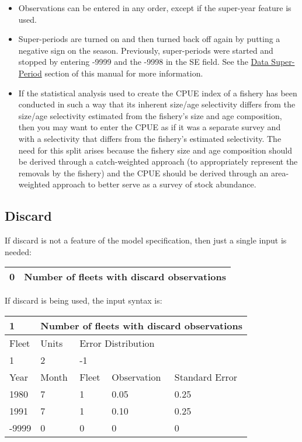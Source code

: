 \begin{itemize}
		\item Observations can be entered in any order, except if the super-year feature is used.
		\item Super-periods are turned on and then turned back off again by putting a negative sign on the season.  Previously, super-periods were started and stopped by entering -9999 and the -9998 in the SE field.  See the \hyperlink{SuperPeriod}{Data Super-Period} section of this manual for more information.
		\item If the statistical analysis used to create the CPUE index of a fishery has been conducted in such a way that its inherent size/age selectivity differs from the size/age selectivity estimated from the fishery's size and age composition, then you may want to enter the CPUE as if it was a separate survey and with a selectivity that differs from the fishery's estimated selectivity.  The need for this split arises because the fishery size and age composition should be derived through a catch-weighted approach (to appropriately represent the removals by the fishery) and the CPUE should be derived through an area-weighted approach to better serve as a survey of stock abundance.
	\end{itemize}

\subsection{Discard}
If discard is not a feature of the model specification, then just a single input is needed:

\begin{center}
\begin{tabular}{p{2cm} p{13cm}}
	\hline
	0 & Number of fleets with discard observations \Tstrut\Bstrut\\
	\hline
\end{tabular}
\end{center}
	
	
If discard is being used, the input syntax is:
\begin{center}
	\begin{tabular}{p{2cm} p{3cm} p{3cm} p{3cm} p{3cm}}
		\hline
		1 & \multicolumn{4}{l}{Number of fleets with discard observations}\Tstrut\Bstrut\\
		\hline
		Fleet & Units & \multicolumn{3}{l}{Error Distribution}\Tstrut\Bstrut\\
		\hline
		1 & 2 & \multicolumn{3}{l}{-1}\Tstrut\Bstrut\\
		\hline
		Year & Month & Fleet  & Observation & Standard Error \Tstrut\Bstrut\\
		\hline
		1980  & 7 & 1 & 0.05 & 0.25 \Tstrut\\
		1991  & 7 & 1 & 0.10 & 0.25 \\
		-9999 & 0 & 0 &    0 & 0 \Bstrut\\
		\hline
	\end{tabular}
\end{center}

